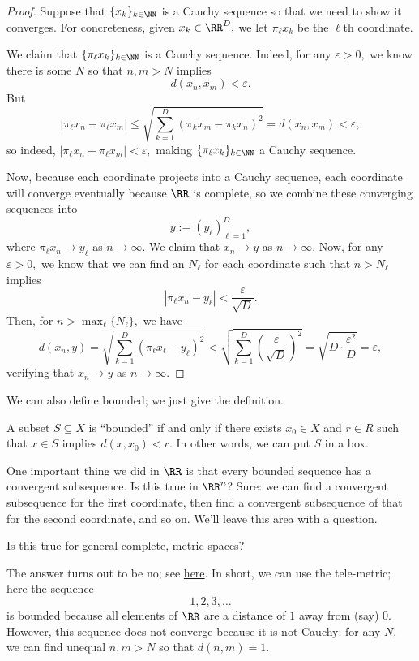 \begin{proof}
    Suppose that $\{x_k\}_{k\in\NN}$ is a Cauchy sequence so that we need to show it converges. For concreteness, given $x_k\in\RR^D,$ we let $\pi_\ell x_k$ be the $\ell$th coordinate.

    We claim that $\{\pi_\ell x_k\}_{k\in\NN}$ is a Cauchy sequence. Indeed, for any $\varepsilon>0,$ we know there is some $N$ so that $n,m>N$ implies
    \[d(x_n,x_m)<\varepsilon.\]
    But
    \[|\pi_\ell x_n-\pi_\ell x_m|\le\sqrt{\sum_{k=1}^D(\pi_kx_m-\pi_kx_n)^2}=d(x_n,x_m)<\varepsilon,\]
    so indeed, $|\pi_\ell x_n-\pi_\ell x_m|<\varepsilon,$ making $\{\pi_\ell x_k\}_{k\in\NN}$ a Cauchy sequence.

    Now, because each coordinate projects into a Cauchy sequence, each coordinate will converge eventually because $\RR$ is complete, so we combine these converging sequences into
    \[y:=(y_\ell)_{\ell=1}^D,\]
    where $\pi_\ell x_n\to y_\ell$ as $n\to\infty.$ We claim that $x_n\to y$ as $n\to\infty.$ Now, for any $\varepsilon>0,$ we know that we can find an $N_\ell$ for each coordinate such that $n>N_\ell$ implies
    \[|\pi_\ell x_n-y_\ell|<\frac{\varepsilon}{\sqrt D}.\]
    Then, for $n>\max_\ell\{N_\ell\},$ we have
    \[d(x_n,y)=\sqrt{\sum_{k=1}^D(\pi_\ell x_\ell-y_\ell)^2}<\sqrt{\sum_{k=1}^D\left(\frac{\varepsilon}{\sqrt D}\right)^2}=\sqrt{D\cdot\frac{\varepsilon^2}D}=\varepsilon,\]
    verifying that $x_n\to y$ as $n\to\infty.$
\end{proof}

We can also define bounded; we just give the definition.
\begin{definition}[Bounded]
    A subset $S\subseteq X$ is ``bounded'' if and only if there exists $x_0\in X$ and $r\in R$ such that $x\in S$ implies $d(x,x_0)<r.$ In other words, we can put $S$ in a box.
\end{definition}
One important thing we did in $\RR$ is that every bounded sequence has a convergent subsequence. Is this true in $\RR^n$? Sure: we can find a convergent subsequence for the first coordinate, then find a convergent subsequence of that for the second coordinate, and so on. We'll leave this area with a question.
\begin{ques}
    Is this true for general complete, metric spaces?
\end{ques}
The answer turns out to be no; see \href{https://math.stackexchange.com/a/399927/869257}{here}. In short, we can use the tele-metric; here the sequence
\[1,2,3,\ldots\]
is bounded because all elements of $\RR$ are a distance of $1$ away from (say) $0.$ However, this sequence does not converge because it is not Cauchy: for any $N,$ we can find unequal $n,m>N$ so that $d(n,m)=1.$

